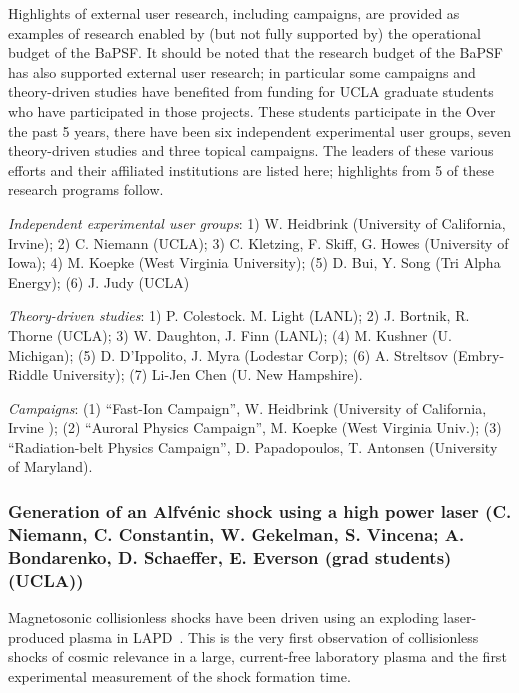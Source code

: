 \documentclass[11pt]{article}
\begin{document}
Highlights of external user research, including campaigns, are
provided as examples of research enabled by (but not fully supported
by) the operational budget of the BaPSF.  It should be noted that the
research budget of the BaPSF has also supported external user
research; in particular some campaigns and theory-driven studies have
benefited from funding for UCLA graduate students who have
participated in those projects.  These students participate in the
Over the past 5 years, there have been six independent experimental
user groups, seven theory-driven studies and three topical
campaigns. The leaders of these various efforts and their affiliated
institutions are listed here; highlights from 5 of these research
programs follow.

\begin{description}
\item{\emph{Independent experimental user groups}}: 1) W. Heidbrink
(University of California, Irvine); 2) C. Niemann (UCLA); 3) C. Kletzing, F. Skiff, G. Howes (University of Iowa); 4) M.
Koepke (West Virginia University); (5) D. Bui, Y. Song (Tri Alpha
Energy); (6) J. Judy (UCLA)

\item{\emph{Theory-driven studies}}: 1) P. Colestock. M. Light (LANL);
2) J. Bortnik, R. Thorne (UCLA); 3) W. Daughton, J. Finn (LANL); (4) M.
Kushner (U. Michigan); (5) D. D'Ippolito, J. Myra (Lodestar Corp); (6)
A. Streltsov (Embry-Riddle University); (7) Li-Jen Chen (U. New
Hampshire).

\item{\emph{Campaigns}}: (1) ``Fast-Ion Campaign'', W. Heidbrink
(University of California, Irvine ); (2) ``Auroral Physics Campaign'', M. Koepke (West Virginia Univ.); (3)
``Radiation-belt Physics Campaign'', D. Papadopoulos, T. Antonsen (University of Maryland).
\end{description}



\subsubsection{Generation of an Alfv\'{e}nic shock
using a high power laser  (C. Niemann, C. Constantin, W. Gekelman,
S. Vincena; A. Bondarenko, D. Schaeffer, E. Everson (grad students) (UCLA))}

Magnetosonic collisionless shocks have been driven using an exploding
laser-produced plasma in LAPD~\citep{schaeffer:2014,niemann:2014}. This is the very first
observation of collisionless shocks of cosmic relevance in a large,
current-free laboratory plasma and the first experimental measurement
of the shock formation time. 
\end{document}

